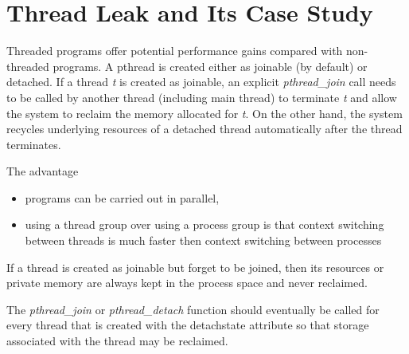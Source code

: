 
\section{Thread Leak and Its Case Study}
Threaded programs offer potential performance gains compared
with non-threaded programs.
A pthread is created either as joinable (by default) or detached. 
If a thread \emph{t} is created as joinable, an explicit \emph{pthread\_join}
call needs to be called by another thread (including main thread) to terminate
\emph{t} and allow the system to reclaim the memory allocated for \emph{t}. 
On the other hand, the system recycles underlying resources of a detached thread
automatically after the thread terminates.

The advantage 
\begin{itemize}
\item programs can be carried out in parallel,
\item using a thread group over using a process group is that context
switching between threads is much faster then context switching between
processes
\end{itemize}

\begin{definition}
If a thread is created as joinable but forget to be joined, then its resources
or private memory are always kept in the process space and never reclaimed.
\end{definition}

The \emph{pthread\_join} or \emph{pthread\_detach} function should eventually be
called for every thread that is created with the detachstate attribute
so that storage associated with the thread may be
reclaimed.